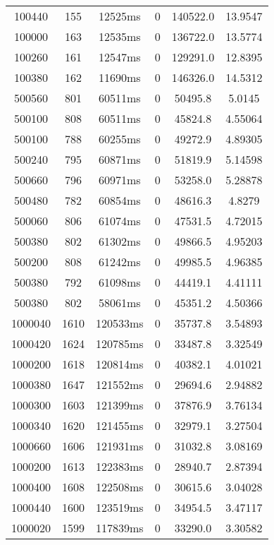 \documentclass[./main.tex]{subfiles}
\begin{document}
\begin{table}
\begin{tabular}{ c | c | c | c | c | c }
        \rowcolor{lightgray} 100440 & 155 & 12525ms & 0 & 140522.0 & 13.9547 \\
        100000 & 163 & 12535ms & 0 & 136722.0 & 13.5774 \\
        100260 & 161 & 12547ms & 0 & 129291.0 & 12.8395 \\
        100380 & 162 & 11690ms & 0 & 146326.0 & 14.5312 \\
        \hline
        500560 & 801 & 60511ms & 0 & 50495.8 & 5.0145 \\
        500100 & 808 & 60511ms & 0 & 45824.8 & 4.55064 \\
        \rowcolor{lightgray} 500100 & 788 & 60255ms & 0 & 49272.9 & 4.89305 \\
        500240 & 795 & 60871ms & 0 & 51819.9 & 5.14598 \\
        500660 & 796 & 60971ms & 0 & 53258.0 & 5.28878 \\
        500480 & 782 & 60854ms & 0 & 48616.3 & 4.8279 \\
        500060 & 806 & 61074ms & 0 & 47531.5 & 4.72015 \\
        500380 & 802 & 61302ms & 0 & 49866.5 & 4.95203 \\
        500200 & 808 & 61242ms & 0 & 49985.5 & 4.96385 \\
        500380 & 792 & 61098ms & 0 & 44419.1 & 4.41111 \\
        500380 & 802 & 58061ms & 0 & 45351.2 & 4.50366 \\
        \hline
        1000040 & 1610 & 120533ms & 0 & 35737.8 & 3.54893 \\
        1000420 & 1624 & 120785ms & 0 & 33487.8 & 3.32549 \\
        1000200 & 1618 & 120814ms & 0 & 40382.1 & 4.01021 \\
        1000380 & 1647 & 121552ms & 0 & 29694.6 & 2.94882 \\
        1000300 & 1603 & 121399ms & 0 & 37876.9 & 3.76134 \\
        1000340 & 1620 & 121455ms & 0 & 32979.1 & 3.27504 \\
        1000660 & 1606 & 121931ms & 0 & 31032.8 & 3.08169 \\
        1000200 & 1613 & 122383ms & 0 & 28940.7 & 2.87394 \\
        1000400 & 1608 & 122508ms & 0 & 30615.6 & 3.04028 \\
        1000440 & 1600 & 123519ms & 0 & 34954.5 & 3.47117 \\
        \rowcolor{lightgray} 1000020 & 1599 & 117839ms & 0 & 33290.0 & 3.30582 \\

\end{tabular}
\end{table}
\end{document}
